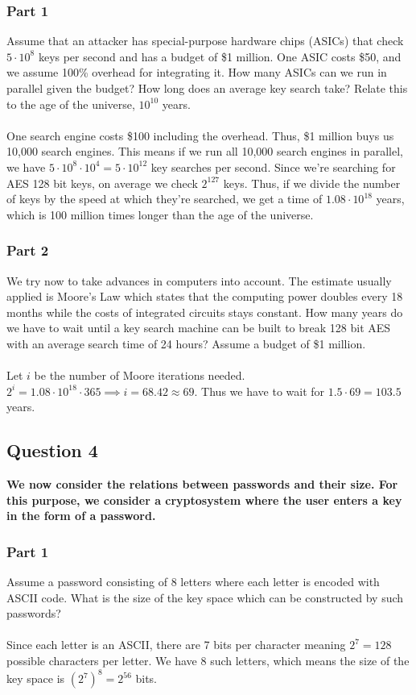 \documentclass[titlepage]{article}
\begin{document}
{{\subsubsection{Part 1}
{
Assume that an attacker has special-purpose hardware chips (ASICs) that check \(5 \cdot 10^8\) keys per second and has a budget of \$1 million. One ASIC costs \$50, and we assume 100\% overhead for integrating it. How many ASICs can we run in parallel given the budget? How long does an average key search take? Relate this to the age of the universe, \(10^{10}\) years.\\\\
One search engine costs \$100 including the overhead. Thus, \$1 million buys us 10,000 search engines. This means if we run all 10,000 search engines in parallel, we have \(5 \cdot 10^8 \cdot 10^4 = 5 \cdot 10^{12}\) key searches per second. Since we're searching for AES 128 bit keys, on average we check \(2^{127}\) keys. Thus, if we divide the number of keys by the speed at which they're searched, we get a time of \(1.08 \cdot 10^{18}\) years, which is 100 million times longer than the age of the universe.
}
\clearpage
\subsubsection{Part 2}
{
We try now to take advances in computers into account. The estimate usually applied is Moore's Law which states that the computing power doubles every 18 months while the costs of integrated circuits stays constant. How many years do we have to wait until a key search machine can be built to break 128 bit AES with an average search time of 24 hours? Assume a budget of \$1 million.\\\\
Let \(i\) be the number of Moore iterations needed. \(2^i = 1.08 \cdot 10^{18} \cdot 365 \implies i = 68.42 \approx 69\). Thus we have to wait for \(1.5 \cdot 69 = 103.5\) years. 
}
}
\subsection{Question 4}
{
\textbf{We now consider the relations between passwords and their size. For this purpose, we consider a cryptosystem where the user enters a key in the form of a password.}
\subsubsection{Part 1}
{
Assume a password consisting of 8 letters where each letter is encoded with ASCII code. What is the size of the key space which can be constructed by such passwords?\\\\
Since each letter is an ASCII, there are 7 bits per character meaning \(2^7 = 128\) possible characters per letter. We have 8 such letters, which means the size of the key space is \((2^7)^8 = 2^{56}\) bits. 
}
}}
\end{document}
